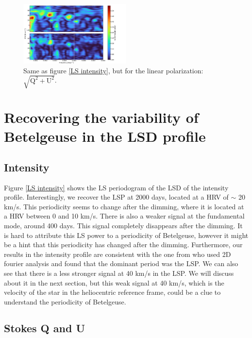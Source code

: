 \documentclass{aa}
\begin{document}
\begin{figure}[!h]
    \centering
    \includegraphics[width=0.5\textwidth]{Lomb-Scargle linear polarization.png}
    \caption{Same as figure \ref{LS intensity}, but for the linear polarization: $\sqrt{\mathrm{Q^2}+\mathrm{U^2}}$.}
    \label{LS linear polarization}
\end{figure}



\section{Recovering the variability of Betelgeuse in the LSD profile}

\subsection{Intensity}
Figure \ref{LS intensity} shows the LS periodogram of the LSD of the intensity profile. Interestingly, we recover the LSP at 2000 days, 
located at a HRV of $\sim$ 20 km/s. This periodicity seems to change after the dimming, where it is located at a HRV between 0 and 10 km/s. 
There is also a weaker signal at the fundamental mode, around 400 days. This signal completely disappears after the dimming. It is hard to attribute 
this LS power to a periodicity of Betelgeuse, however it might be a hint that this periodicity has changed after the dimming. Furthermore, our results 
in the intensity profile are consistent with the one from \cite{mathias_evolution_2018} who used 2D fourier analysis and found that the dominant period was the LSP. 
We can also see that there is a less stronger signal at 40 km/s in the LSP. We will discuss about it in the next section, but this weak 
signal at 40 km/s, which is the velocity of the star in the heliocentric reference frame, could be a clue to understand the periodicity of Betelgeuse. 


\subsection{Stokes Q and U}
\end{document}
